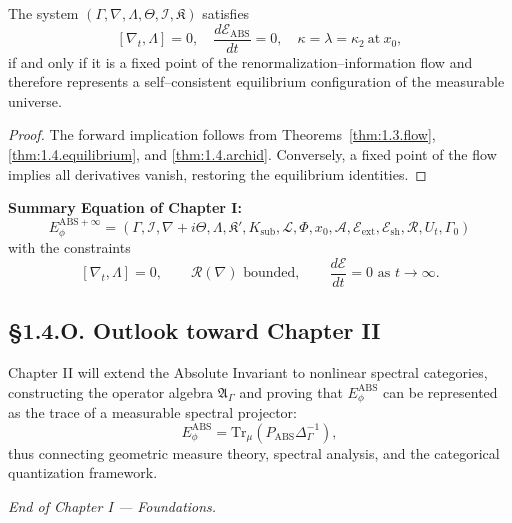 \begin{theorem}\label{thm:1.4.self}
The system $(\Gamma,\nabla,\Lambda,\Theta,\mathcal I,\mathfrak K)$ satisfies
\[
[\nabla_t,\Lambda]=0,\quad
\frac{d\mathcal E_{\mathrm{ABS}}}{dt}=0,\quad
\kappa=\lambda=\kappa_2\ \text{at}\ x_0,
\]
if and only if it is a fixed point of the renormalization–information flow and therefore represents a self–consistent equilibrium configuration of the measurable universe.
\end{theorem}

\begin{proof}
The forward implication follows from Theorems~\ref{thm:1.3.flow}, \ref{thm:1.4.equilibrium}, and \ref{thm:1.4.archid}.  
Conversely, a fixed point of the flow implies all derivatives vanish, restoring the equilibrium identities.
\end{proof}

\begin{center}
\textbf{Summary Equation of Chapter I:}
\[
\boxed{
E_\phi^{\mathrm{ABS+}\infty}
 =(\Gamma,\mathcal I,\nabla+i\Theta,\Lambda,
  \mathfrak K',K_{\mathrm{sub}},
  \mathcal L,\Phi,x_0,\mathcal A,
  \mathcal E_{\mathrm{ext}},\mathcal E_{\mathrm{sh}},\mathcal R,U_t,\Gamma_0)
}
\]
with the constraints
\[
[\nabla_t,\Lambda]=0,\qquad
\mathcal R(\nabla)\text{ bounded},\qquad
\frac{d\mathcal E}{dt}=0\text{ as }t\to\infty.
\]
\end{center}

\subsection*{§1.4.O. Outlook toward Chapter II}

Chapter II will extend the Absolute Invariant to nonlinear spectral categories, constructing the operator algebra $\mathfrak A_\Gamma$ and proving that $E_\phi^{\mathrm{ABS}}$ can be represented as the trace of a measurable spectral projector:
\[
E_\phi^{\mathrm{ABS}} = \mathrm{Tr}_\mu(P_{\mathrm{ABS}}\Delta^{-1}_\Gamma),
\]
thus connecting geometric measure theory, spectral analysis, and the categorical quantization framework.

\begin{center}
\textit{End of Chapter I — Foundations.}
\end{center}

